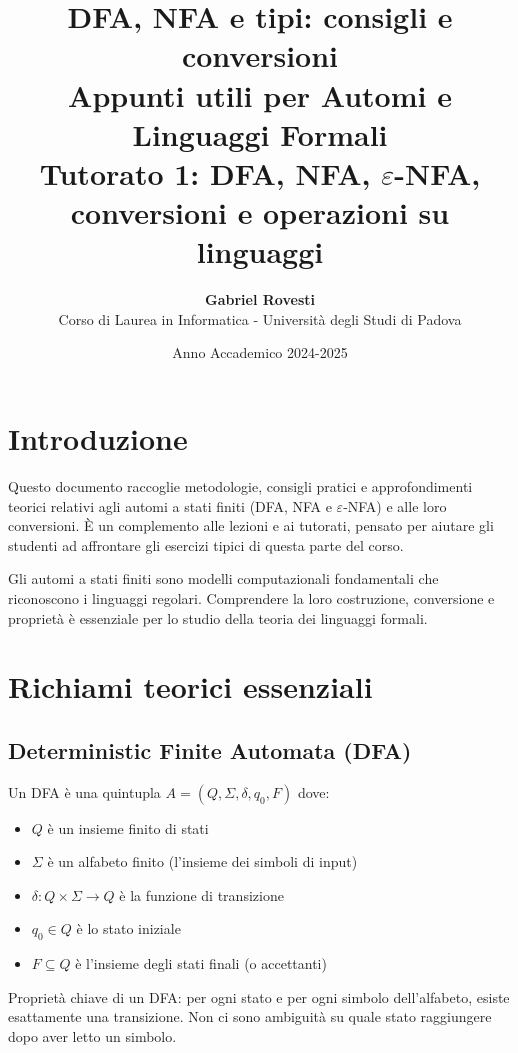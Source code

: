 \documentclass[12pt,a4paper]{article}
\title{
  \vspace{1cm}
  \Huge \textbf{DFA, NFA e tipi: consigli e conversioni}\\[0.5cm]
  \Large \textbf{Appunti utili per Automi e Linguaggi Formali}\\
  \normalsize Tutorato 1: DFA, NFA, $\varepsilon$-NFA, conversioni e operazioni su linguaggi
}
\author{\textbf{Gabriel Rovesti} \\
Corso di Laurea in Informatica - Università degli Studi di Padova
}
\date{Anno Accademico 2024-2025}
\begin{document}
\maketitle
\tableofcontents
\newpage

\section{Introduzione}

Questo documento raccoglie metodologie, consigli pratici e approfondimenti teorici relativi agli automi a stati finiti (DFA, NFA e $\varepsilon$-NFA) e alle loro conversioni. È un complemento alle lezioni e ai tutorati, pensato per aiutare gli studenti ad affrontare gli esercizi tipici di questa parte del corso.

\begin{concettochiave}
Gli automi a stati finiti sono modelli computazionali fondamentali che riconoscono i linguaggi regolari. Comprendere la loro costruzione, conversione e proprietà è essenziale per lo studio della teoria dei linguaggi formali.
\end{concettochiave}

\section{Richiami teorici essenziali}

\subsection{Deterministic Finite Automata (DFA)}

Un DFA è una quintupla $A = (Q, \Sigma, \delta, q_0, F)$ dove:
\begin{itemize}
  \item $Q$ è un insieme finito di stati
  \item $\Sigma$ è un alfabeto finito (l'insieme dei simboli di input)
  \item $\delta: Q \times \Sigma \rightarrow Q$ è la funzione di transizione
  \item $q_0 \in Q$ è lo stato iniziale
  \item $F \subseteq Q$ è l'insieme degli stati finali (o accettanti)
\end{itemize}

\begin{concettochiave}
Proprietà chiave di un DFA: per ogni stato e per ogni simbolo dell'alfabeto, esiste esattamente una transizione. Non ci sono ambiguità su quale stato raggiungere dopo aver letto un simbolo.
\end{concettochiave}
\end{document}
